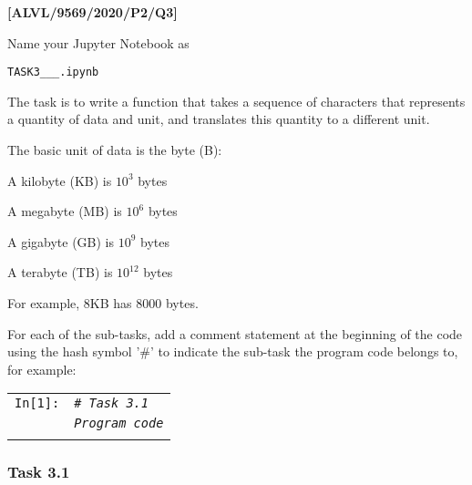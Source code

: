 \begin{onehalfspace}
\item \textbf{{[}ALVL/9569/2020/P2/Q3{]} }
\end{onehalfspace}

\begin{onehalfspace}
\noindent Name your Jupyter Notebook as

\noindent \texttt{TASK3\_<your name>\_<centre number>\_<index number>.ipynb}

\noindent The task is to write a function that takes a sequence of
characters that represents a quantity of data and unit, and translates
this quantity to a different unit.

\noindent The basic unit of data is the byte (B):
\end{onehalfspace}
\begin{itemize}
\begin{onehalfspace}
\item A kilobyte (KB) is $10^{3}$ bytes
\item A megabyte (MB) is $10^{6}$ bytes
\item A gigabyte (GB) is $10^{9}$ bytes
\item A terabyte (TB) is $10^{12}$ bytes
\end{onehalfspace}
\end{itemize}
\begin{onehalfspace}
\noindent For example, 8KB has 8000 bytes.

\noindent For each of the sub-tasks, add a comment statement at the
beginning of the code using the hash symbol '\#' to indicate the sub-task
the program code belongs to, for example:

\noindent %
\begin{tabular}{l|>{\raggedright}p{}|}
\cline{2-2} 
\texttt{In{[}1{]}:} & \texttt{\emph{\# Task 3.1}}\tabularnewline
 & \texttt{\emph{Program code}}\tabularnewline
\cline{2-2} 
\multicolumn{1}{l}{} & \multicolumn{1}{>{\raggedright}p{0.77\textwidth}}{\texttt{Output :}}\tabularnewline
\end{tabular}
\end{onehalfspace}
\begin{onehalfspace}

\subsubsection*{Task 3.1}
\end{onehalfspace}

